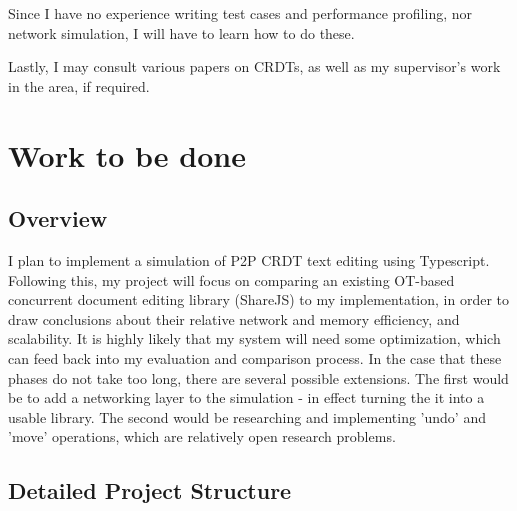 \documentclass[12pt,a4paper,twoside]{article}
\begin{document}
Since I have no experience writing test cases and performance profiling, nor network simulation, 
I will have to learn how to do these.

Lastly, I may consult various papers on CRDTs, as well as my supervisor's work in the area, if required.

\section*{Work to be done}

\subsection*{Overview}
I plan to implement a simulation of P2P CRDT text editing using Typescript. Following this, my project will focus on
comparing an existing OT-based concurrent document editing library (ShareJS) to my implementation, in order to draw conclusions
about their relative network and memory efficiency, and scalability. It is highly likely that my 
system will need some optimization, which can feed back into my evaluation and comparison process. In the case that
these phases do not take too long, there are several possible extensions. The first would be to add
a networking layer to the simulation - in effect turning the it into a usable library. The second would be
researching and implementing 'undo' and 'move' operations, which are relatively open research problems.

\subsection*{Detailed Project Structure}
\end{document}

